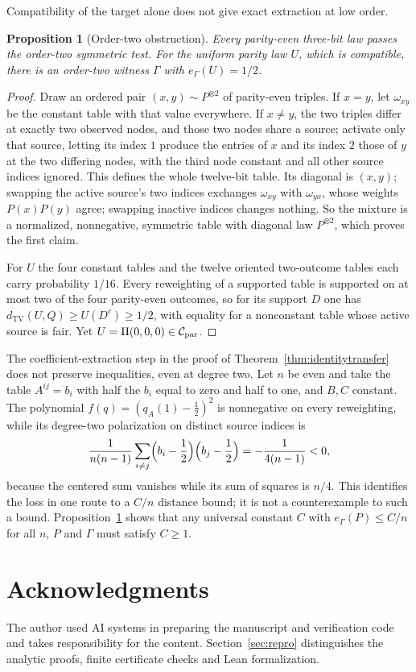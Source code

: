 \documentclass[11pt]{article}
\theoremstyle{plain}
\newtheorem{proposition}[theorem]{Proposition}
\theoremstyle{definition}
\DeclareMathOperator{\TV}{TV}
\begin{document}
Compatibility of the target alone does not give exact extraction at low order.

\begin{proposition}[Order-two obstruction]\label{prop:lowextraction}
Every parity-even three-bit law passes the order-two symmetric test. For the uniform parity law $U$, which is compatible, there is an order-two witness $\Gamma$ with $e_\Gamma(U)=1/2$.
\end{proposition}

\begin{proof}
Draw an ordered pair $(x,y)\sim P^{\otimes2}$ of parity-even triples. If $x=y$, let $\omega_{xy}$ be the constant table with that value everywhere. If $x\ne y$, the two triples differ at exactly two observed nodes, and those two nodes share a source; activate only that source, letting its index $1$ produce the entries of $x$ and its index $2$ those of $y$ at the two differing nodes, with the third node constant and all other source indices ignored. This defines the whole twelve-bit table. Its diagonal is $(x,y)$; swapping the active source's two indices exchanges $\omega_{xy}$ with $\omega_{yx}$, whose weights $P(x)P(y)$ agree; swapping inactive indices changes nothing. So the mixture is a normalized, nonnegative, symmetric table with diagonal law $P^{\otimes2}$, which proves the first claim.

For $U$ the four constant tables and the twelve oriented two-outcome tables each carry probability $1/16$. Every reweighting of a supported table is supported on at most two of the four parity-even outcomes, so for its support $D$ one has $d_{\TV}(U,Q)\ge U(D^c)\ge1/2$, with equality for a nonconstant table whose active source is fair. Yet $U=\Pi(0,0,0)\in\mathcal C_{\mathrm{par}}$.
\end{proof}

The coefficient-extraction step in the proof of Theorem~\ref{thm:identitytransfer} does not preserve inequalities, even at degree two. Let $n$ be even and take the table $A^{ij}=b_i$ with half the $b_i$ equal to zero and half to one, and $B,C$ constant. The polynomial $f(q)=(q_A(1)-\tfrac12)^2$ is nonnegative on every reweighting, while its degree-two polarization on distinct source indices is
\[
\frac1{n(n-1)}\sum_{i\ne j}\Bigl(b_i-\frac12\Bigr)\Bigl(b_j-\frac12\Bigr)=-\frac1{4(n-1)}<0,
\]
because the centered sum vanishes while its sum of squares is $n/4$. This identifies the loss in one route to a $C/n$ distance bound; it is not a counterexample to such a bound. Proposition~\ref{prop:lowextraction} shows that any universal constant $C$ with $e_\Gamma(P)\le C/n$ for all $n$, $P$ and $\Gamma$ must satisfy $C\ge1$.


\section*{Acknowledgments}
The author used AI systems in preparing the manuscript and verification code and takes responsibility for the content. Section~\ref{sec:repro} distinguishes the analytic proofs, finite certificate checks and Lean formalization.

\begingroup
\small
\raggedright


\endgroup
\end{document}
